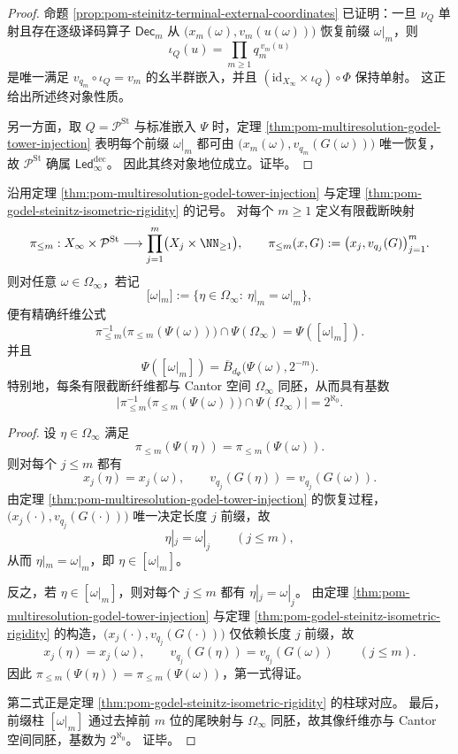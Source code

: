 \begin{proof}
命题 \ref{prop:pom-steinitz-terminal-external-coordinates} 已证明：一旦 \(\nu_Q\) 单射且存在逐级译码算子 \(\mathsf{Dec}_m\) 从 \(\bigl(x_m(\omega),v_m(u(\omega))\bigr)\) 恢复前缀 \(\omega|_m\)，则
\[
\iota_Q(u)=\prod_{m\ge 1} q_m^{\,v_m(u)}
\]
是唯一满足 \(v_{q_m}\circ \iota_Q=v_m\) 的幺半群嵌入，并且 \((\mathrm{id}_{X_\infty}\times \iota_Q)\circ \Phi\) 保持单射。
这正给出所述终对象性质。

另一方面，取 \(Q=\mathcal P^{\mathrm{St}}\) 与标准嵌入 \(\Psi\) 时，定理 \ref{thm:pom-multiresolution-godel-tower-injection} 表明每个前缀 \(\omega|_m\) 都可由 \(\bigl(x_m(\omega),v_{q_m}(G(\omega))\bigr)\) 唯一恢复，故 \(\mathcal P^{\mathrm{St}}\) 确属 \(\mathsf{Led}^{\mathrm{dec}}_\infty\)。
因此其终对象地位成立。证毕。
\end{proof}

\begin{theorem}[有限截断证书的精确纤维等于前缀柱]\label{thm:pom-godel-steinitz-finite-truncation-fiber-cylinder}
沿用定理 \ref{thm:pom-multiresolution-godel-tower-injection} 与定理 \ref{thm:pom-godel-steinitz-isometric-rigidity} 的记号。
对每个 \(m\ge 1\) 定义有限截断映射
\[
\pi_{\le m}:X_\infty\times \mathcal P^{\mathrm{St}}
\longrightarrow
\prod_{j=1}^{m}\bigl(X_j\times \NN_{\ge 1}\bigr),
\qquad
\pi_{\le m}(x,G):=\bigl(x_j,v_{q_j}(G)\bigr)_{j=1}^{m}.
\]
则对任意 \(\omega\in\Omega_\infty\)，若记
\[
[\omega|_m]:=\{\eta\in\Omega_\infty:\ \eta|_m=\omega|_m\},
\]
便有精确纤维公式
\[
\pi_{\le m}^{-1}\!\bigl(\pi_{\le m}(\Psi(\omega))\bigr)\cap \Psi(\Omega_\infty)
=
\Psi([\omega|_m]).
\]
并且
\[
\Psi([\omega|_m])
=
\overline{B}_{d_\Psi}\bigl(\Psi(\omega),2^{-m}\bigr).
\]
特别地，每条有限截断纤维都与 Cantor 空间 \(\Omega_\infty\) 同胚，从而具有基数
\[
\bigl|\pi_{\le m}^{-1}\!\bigl(\pi_{\le m}(\Psi(\omega))\bigr)\cap \Psi(\Omega_\infty)\bigr|
=
2^{\aleph_0}.
\]
\end{theorem}
\begin{proof}
设 \(\eta\in\Omega_\infty\) 满足
\[
\pi_{\le m}(\Psi(\eta))=\pi_{\le m}(\Psi(\omega)).
\]
则对每个 \(j\le m\) 都有
\[
x_j(\eta)=x_j(\omega),
\qquad
v_{q_j}(G(\eta))=v_{q_j}(G(\omega)).
\]
由定理 \ref{thm:pom-multiresolution-godel-tower-injection} 的恢复过程，\(\bigl(x_j(\cdot),v_{q_j}(G(\cdot))\bigr)\) 唯一决定长度 \(j\) 前缀，故
\[
\eta|_j=\omega|_j
\qquad (j\le m),
\]
从而 \(\eta|_m=\omega|_m\)，即 \(\eta\in[\omega|_m]\)。

反之，若 \(\eta\in[\omega|_m]\)，则对每个 \(j\le m\) 都有 \(\eta|_j=\omega|_j\)。
由定理 \ref{thm:pom-multiresolution-godel-tower-injection} 与定理 \ref{thm:pom-godel-steinitz-isometric-rigidity} 的构造，\(\bigl(x_j(\cdot),v_{q_j}(G(\cdot))\bigr)\) 仅依赖长度 \(j\) 前缀，故
\[
x_j(\eta)=x_j(\omega),
\qquad
v_{q_j}(G(\eta))=v_{q_j}(G(\omega))
\qquad (j\le m).
\]
因此 \(\pi_{\le m}(\Psi(\eta))=\pi_{\le m}(\Psi(\omega))\)，第一式得证。

第二式正是定理 \ref{thm:pom-godel-steinitz-isometric-rigidity} 的柱球对应。
最后，前缀柱 \( [\omega|_m]\) 通过去掉前 \(m\) 位的尾映射与 \(\Omega_\infty\) 同胚，故其像纤维亦与 Cantor 空间同胚，基数为 \(2^{\aleph_0}\)。
证毕。
\end{proof}

